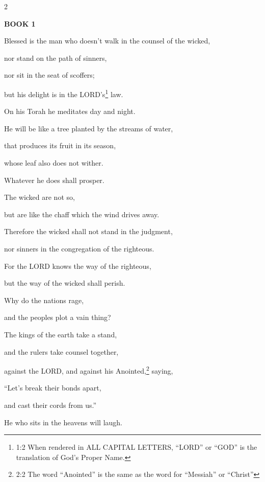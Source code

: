 \vspace{-1.20in}
\begin{multicols}{2}
	
	\begin{center}
		{\LARGE\textbf{BOOK 1}}
	\end{center}
	
	\mychapter{}\myverse*{}Blessed is the man who doesn’t walk in the counsel of the wicked,
	
	nor stand on the path of sinners,
	
	nor sit in the seat of scoffers;
	
	
	\myverse{}but his delight is in the LORD’s\footnote{1:2 When rendered in ALL CAPITAL LETTERS, “LORD” or “GOD” is the translation of God’s Proper Name.}
	law.
	
	On his Torah he meditates day and night.
	
	
	\myverse{}He will be like a tree planted by the streams of water,
	
	that produces its fruit in its season,
	
	whose leaf also does not wither.
	
	Whatever he does shall prosper.
	
	
	\myverse{}The wicked are not so,
	
	but are like the chaff which the wind drives away.
	
	
	\myverse{}Therefore the wicked shall not stand in the judgment,
	
	nor sinners in the congregation of the righteous.
	
	
	\myverse{}For the LORD knows the way of the righteous,
	
	but the way of the wicked shall perish.
	
	
	\mychapter{}\myverse*{}Why do the nations rage,
	
	and the peoples plot a vain thing?
	
	
	\myverse{}The kings of the earth take a stand,
	
	and the rulers take counsel together,
	
	against the LORD, and against his Anointed,\footnote{2:2 The word “Anointed” is the same as the word for “Messiah” or “Christ”} saying,
	
	
	\myverse{}“Let’s break their bonds apart,
	
	and cast their cords from us.”
	
	
	\myverse{}He who sits in the heavens will laugh.
	

\end{multicols}
